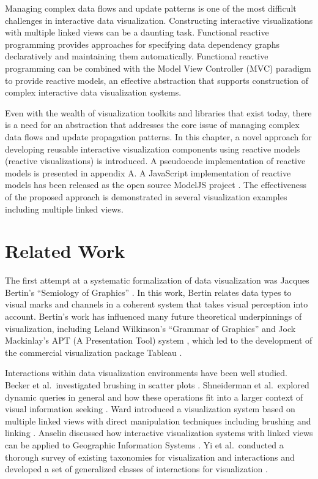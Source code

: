 Managing complex data flows and update patterns is one of the most difficult challenges in interactive data visualization. Constructing interactive visualizations with multiple linked views can be a daunting task. Functional reactive programming provides approaches for specifying data dependency graphs declaratively and maintaining them automatically. Functional reactive programming can be combined with the Model View Controller (MVC) paradigm to provide reactive models, an effective abstraction that supports construction of complex interactive data visualization systems.

Even with the wealth of visualization toolkits and libraries that exist today, there is a need for an abstraction that addresses the core issue of managing complex data flows and update propagation patterns. In this chapter, a novel approach for developing reusable interactive visualization components using reactive models (reactive visualizations) is introduced. A pseudocode implementation of reactive models is presented in appendix A. A JavaScript implementation of reactive models has been released as the open source ModelJS project \cite{modeljs}. The effectiveness of the proposed approach is demonstrated in several visualization examples including multiple linked views.

\section{Related Work}
The first attempt at a systematic formalization of data visualization was Jacques Bertin's ``Semiology of Graphics'' \cite{bertin1983semiology}. In this work, Bertin relates data types to visual marks and channels in a coherent system that takes visual perception into account. Bertin's work has influenced many future theoretical underpinnings of visualization, including Leland Wilkinson's ``Grammar of Graphics'' \cite{wilkinson2005grammar} and Jock Mackinlay's APT (A Presentation Tool) system \cite{mackinlay1986automating}, which led to the development of the commercial visualization package Tableau \cite{hanrahan2007visual}.

Interactions within data visualization environments have been well studied. Becker et al.\ investigated brushing in scatter plots \cite{becker1987brushing}. Shneiderman et al.\ explored dynamic queries in general and how these operations fit into a larger context of visual information seeking \cite{shneiderman1994dynamic}. Ward introduced a visualization system based on multiple linked views with direct manipulation techniques including brushing and linking \cite{ward1994xmdvtool}. Anselin discussed how interactive visualization systems with linked views can be applied to Geographic Information Systems \cite{anselin1999interactive}. Yi et al.\ conducted a thorough survey of existing taxonomies for visualization and interactions and developed a set of generalized classes of interactions for visualization \cite{yi2007toward}.

